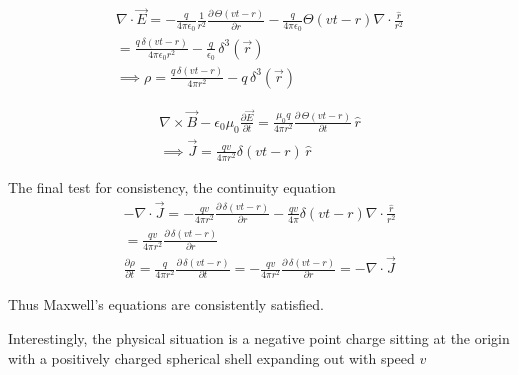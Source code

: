\documentclass[../main.tex]{subfiles}
\begin{document}
\begin{questions}
\begin{parts}
\begin{solution}
		\begin{gather}
			\nabla\cdot\vec{E} = -\frac{q}{4\pi\epsilon_0}\frac{1}{r^2}\frac{\partial\, \Theta(vt-r)}{\partial r}-\frac{q}{4\pi\epsilon_0}\Theta(vt-r)\nabla\cdot\frac{\hat{r}}{r^2}
			\\
			= \frac{q\,\delta(vt-r)}{4\pi\epsilon_0 r^2}-\frac{q}{\epsilon_0}\,\delta^3(\vec{r})
			\\
			\implies \rho = \frac{q\,\delta(vt-r)}{4\pi r^2}-q\,\delta^3(\vec{r})
		\end{gather}

		\begin{gather}
			\nabla\times\vec{B} -\epsilon_0\mu_0\frac{\partial\vec{E}}{\partial t}= \frac{\mu_0 q}{4\pi r^2}\frac{\partial\,\Theta(vt-r)}{\partial t}\,\hat{r}
			\\
			\implies \vec{J} = \frac{qv}{4\pi r^2} \delta(vt-r)\,\hat{r}
		\end{gather}

		The final test for consistency, the continuity equation
		\begin{gather}
			-\nabla\cdot \vec{J} = -\frac{qv}{4\pi r^2}\frac{\partial\,\delta(vt-r)}{\partial r}-\frac{qv}{4\pi}\delta(vt-r)\nabla\cdot\frac{\hat{r}}{r^2}
			\\
			= \frac{qv}{4\pi r^2}\frac{\partial\,\delta(vt-r)}{\partial r}
			\\
			\frac{\partial \rho}{\partial t} =\frac{q}{4\pi r^2}\frac{\partial\,\delta(vt-r)}{\partial t} = -\frac{qv}{4\pi r^2}\frac{\partial\,\delta(vt-r)}{\partial r} = -\nabla\cdot\vec{J}
		\end{gather}

		Thus Maxwell's equations are consistently  satisfied.

		Interestingly, the physical situation is a negative point charge sitting at the origin with a positively charged spherical shell expanding out with speed $v$

		\begin{center}
\end{center}
\end{solution}
\end{parts}
\end{questions}
\end{document}
